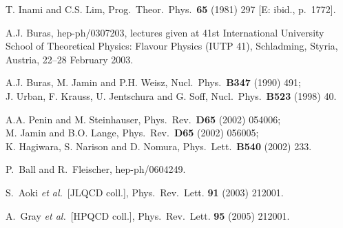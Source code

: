 \documentclass[11pt]{cernrep}
\begin{document}
\begin{thebibliography}{999}
T. Inami and C.S. Lim,
{ Prog.\ Theor.\ Phys.}~{\bf 65} (1981) 297
[E: ibid., p.\ 1772].

A.J. Buras, hep-ph/0307203,
lectures given at 41st International University School of Theoretical 
Physics: Flavour Physics (IUTP 41), Schladming, Styria, 
Austria, 22--28 February 2003.

A.J. Buras, M. Jamin and P.H. Weisz,
{ Nucl.\ Phys.}~{\bf B347} (1990) 491;\\
J. Urban, F. Krauss, U. Jentschura and G. Soff,
{ Nucl.\ Phys.}~{\bf B523} (1998) 40.

A.A. Penin and M. Steinhauser,
{ Phys.\ Rev.}~{\bf D65} (2002) 054006;\\
M. Jamin and B.O. Lange,
{ Phys.\ Rev.}~{\bf D65} (2002) 056005;\\
K. Hagiwara, S. Narison and D. Nomura,
{ Phys.\ Lett.}~{\bf B540} (2002) 233.

P.~Ball and R.~Fleischer,
  hep-ph/0604249.

S.~Aoki {\it et al.}\  [JLQCD coll.],
{ Phys.\ Rev.\ Lett.} {\bf 91} (2003) 212001.

A.~Gray {\it et al.}\  [HPQCD coll.],
{  Phys.\ Rev.\ Lett.} {\bf 95} (2005) 212001.


\end{thebibliography}
\end{document}
